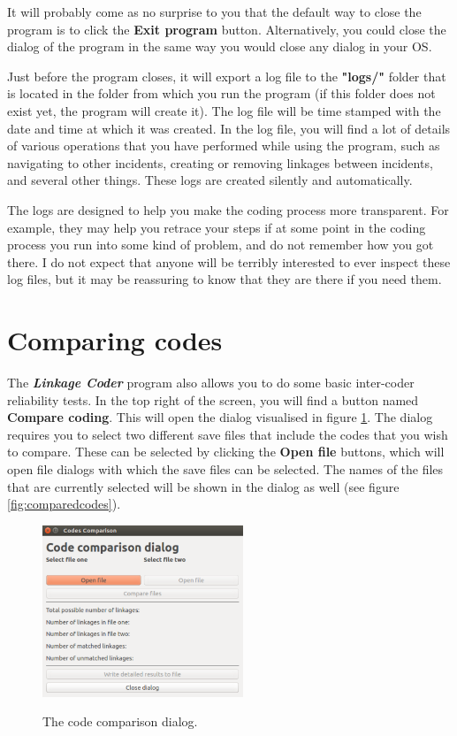 \documentclass{memoir}
\begin{document}
It will probably come as no surprise to you that the default way to close the program is to click the \textbf{Exit program} button. Alternatively, you could close the dialog of the program in the same way you would close any dialog in your OS.

Just before the program closes, it will export a log file to the \textbf{"logs/"} folder that is located in the folder from which you run the program (if this folder does not exist yet, the program will create it). The log file will be time stamped with the date and time at which it was created. In the log file, you will find a lot of details of various operations that you have performed while using the program, such as navigating to other incidents, creating or removing linkages between incidents, and several other things. These logs are created silently and automatically.

The logs are designed to help you make the coding process more transparent. For example, they may help you retrace your steps if at some point in the coding process you run into some kind of problem, and do not remember how you got there. I do not expect that anyone will be terribly interested to ever inspect these log files, but it may be reassuring to know that they are there if you need them.  

\section{Comparing codes}
\label{sec:comparingcodes}

The \emph{\textbf{Linkage Coder}} program also allows you to do some basic inter-coder reliability tests. In the top right of the screen, you will find a button named \textbf{Compare coding}. This will open the dialog visualised in figure \ref{fig:codecomparisondialog}. The dialog requires you to select two different save files that include the codes that you wish to compare. These can be selected by clicking the \textbf{Open file} buttons, which will open file dialogs with which the save files can be selected. The names of the files that are currently selected will be shown in the dialog as well (see figure \ref{fig:comparedcodes}). 

\begin{figure}[h!]
  \centering
  \caption{The code comparison dialog.}
  \includegraphics[width=60mm]{Screenshot_13.pdf}
  \label{fig:codecomparisondialog}
\end{figure}
\end{document}
